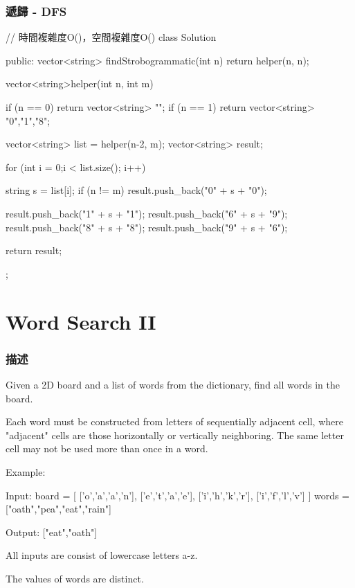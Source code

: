\subsubsection{遞歸 - DFS}
\begin{Code}
// 時間複雜度O()，空間複雜度O()
class Solution {
public:
    vector<string> findStrobogrammatic(int n)
    {
        return helper(n, n);
    }

    vector<string>helper(int n, int m)
    {
        if (n == 0) return vector<string> {""};
        if (n == 1) return vector<string> {"0","1","8"};

        vector<string> list = helper(n-2, m);
        vector<string> result;

        for (int i = 0;i < list.size(); i++)
        {
            string s = list[i];
            if (n != m) result.push_back("0" + s + "0");

            result.push_back("1" + s + "1");
            result.push_back("6" + s + "9");
            result.push_back("8" + s + "8");
            result.push_back("9" + s + "6");
        }
        return result;
    }
};
\end{Code}

\section{Word Search II} %
\label{sec:word-search-ii}


\subsubsection{描述}
Given a 2D board and a list of words from the dictionary, find all words in the board.

Each word must be constructed from letters of sequentially adjacent cell, where "adjacent" cells are those horizontally or vertically neighboring. The same letter cell may not be used more than once in a word.

Example:
\begin{Code}
Input:
board = [
  ['o','a','a','n'],
  ['e','t','a','e'],
  ['i','h','k','r'],
  ['i','f','l','v']
]
words = ["oath","pea","eat","rain"]

Output: ["eat","oath"]
\end{Code}

\begindot
\item All inputs are consist of lowercase letters a-z.
\item The values of words are distinct.
\myenddot

